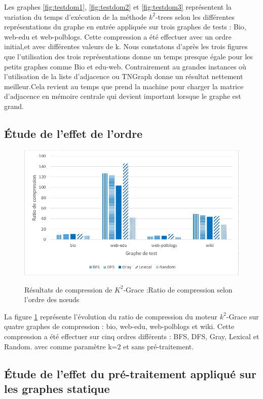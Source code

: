 Les graphes \ref{fig:testdom1}, \ref{fig:testdom2} et \ref{fig:testdom3} représentent la variation du temps d'exécution de la méthode $k^2$-trees selon les différentes représentations du graphe en entrée appliquée sur trois graphes de tests : Bio, web-edu et web-polblogs. Cette compression a été effectuer avec un ordre initial,et avec différentes valeurs de k. 
Nous constatons d'après les trois figures que l'utilisation des trois représentations donne un temps presque égale pour les petits graphes comme Bio et edu-web. Contrairement au grandes instances où l’utilisation de la liste d’adjacence ou TNGraph donne un résultat nettement meilleur.Cela revient au temps que prend la machine pour charger la matrice d'adjacence en mémoire centrale qui devient important lorsque le graphe est grand. 
 			
\subsection{Étude de l'effet de l'ordre}

\begin{figure}[H]
	\centering
	\includegraphics[scale=1]{ressources/image/Tests/k2-ordre.png}
	\label{fig:K2-ordre }
	\caption{Résultats de compression de $K^2$-Grace :Ratio de compression selon l'ordre des nœuds}
\end{figure}		

La figure \ref{fig:K2-ordre } représente l'évolution du ratio de compression du moteur $k^2$-Grace sur quatre graphes de compression : bio, web-edu, web-polblogs et wiki. Cette compression a été effectuer sur cinq ordres différents : BFS, DFS, Gray, Lexical et Random. avec comme paramètre k=2 et sans pré-traitement.


\subsection{Étude de l'effet du pré-traitement appliqué sur les graphes statique }

